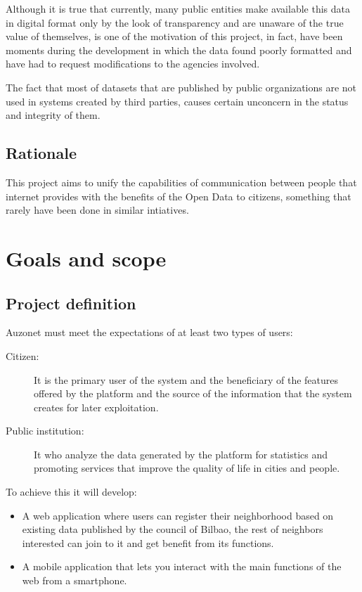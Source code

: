 \documentclass{DeustoFDP}
\begin{document}
Although it is true that currently, many public entities make available this data in digital format only by the look of transparency and are unaware of the true value of themselves, is one of the motivation of this project, in fact, have been moments during the development in which the data found poorly formatted and have had to request modifications to the agencies involved.

The fact that most of datasets that are published by public organizations are not used in systems created by third parties, causes certain unconcern in the status and integrity of them.

\section{Rationale}
This project aims to unify the capabilities of communication between people that internet provides with the benefits of the Open Data to citizens, something that rarely have been done in similar intiatives.

\chapter{Goals and scope}
\section{Project definition}
Auzonet must meet the expectations of at least two types of users:
\begin{description}
	\item[Citizen:] It is the primary user of the system and the beneficiary of the features offered by the platform and the source of the information that the system creates for later exploitation.
	\item[Public institution:] It who analyze the data generated by the platform for statistics and promoting services that improve the quality of life in cities and people.
\end{description}

To achieve this it will develop:
\begin{itemize}
	\item A web application where users can register their neighborhood based on existing data published by the council of Bilbao, the rest of neighbors interested can join to it and get benefit from its functions.
	
	\item A mobile application that lets you interact with the main functions of the web from a smartphone.
\end{itemize}
\end{document}
